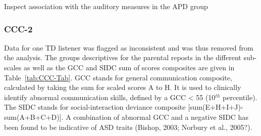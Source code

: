 \documentclass[a4paper, twoside]{templates/ociamthesis}
\begin{document}
\begin{table}

\caption{\label{tab:Background-Tab}Add caption here.}
\centering
{}
\end{table}

Inspect association with the auditory measures in the APD group

\hypertarget{ccc-2}{%
\subsubsection{CCC-2}\label{ccc-2}}

Data for one TD listener was flagged as inconsistent and was thus removed from the analysis. The groups descriptives for the parental reposts in the different sub-scales as well as the GCC and SIDC sum of scores composites are given in Table~\ref{tab:CCC-Tab}. GCC stands for general communication composite, calculated by taking the sum for scaled scores A to H. It is used to clinically identify abnormal communication skills, defined by a GCC \textless{} 55 (10\(^{th}\) percentile). The SIDC stands for social-interaction deviance composite {[}sum(E+H+I+J)-sum(A+B+C+D){]}. A combination of abnormal GCC and a negative SIDC has been found to be indicative of ASD traits (Bishop, 2003; Norbury et al., 2005?).
\end{document}
